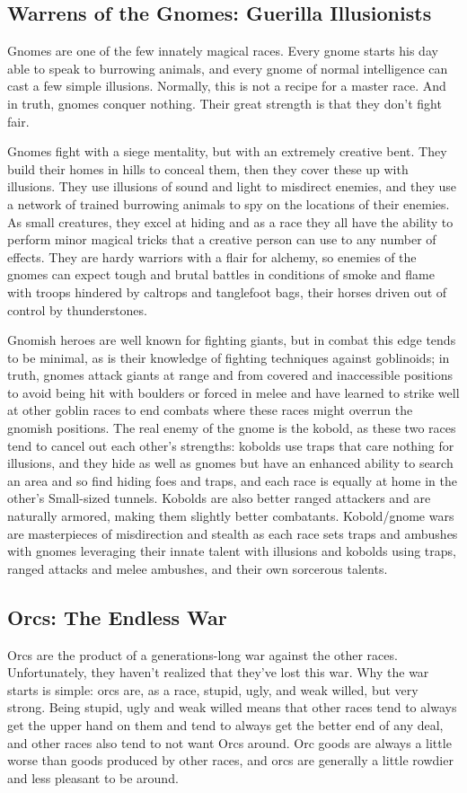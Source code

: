 \subsection{Warrens of the Gnomes: Guerilla Illusionists}
Gnomes are one of the few innately magical races. Every gnome starts his day able to speak to burrowing animals, and every gnome of normal intelligence can cast a few simple illusions. Normally, this is not a recipe for a master race. And in truth, gnomes conquer nothing. Their great strength is that they don't fight fair.

Gnomes fight with a siege mentality, but with an extremely creative bent. They build their homes in hills to conceal them, then they cover these up with illusions. They use illusions of sound and light to misdirect enemies, and they use a network of trained burrowing animals to spy on the locations of their enemies. As small creatures, they excel at hiding and as a race they all have the ability to perform minor magical tricks that a creative person can use to any number of effects. They are hardy warriors with a flair for alchemy, so enemies of the gnomes can expect tough and brutal battles in conditions of smoke and flame with troops hindered by caltrops and tanglefoot bags, their horses driven out of control by thunderstones.

Gnomish heroes are well known for fighting giants, but in combat this edge tends to be minimal, as is their knowledge of fighting techniques against goblinoids; in truth, gnomes attack giants at range and from covered and inaccessible positions to avoid being hit with boulders or forced in melee and have learned to strike well at other goblin races to end combats where these races might overrun the gnomish positions. The real enemy of the gnome is the kobold, as these two races tend to cancel out each other's strengths: kobolds use traps that care nothing for illusions, and they hide as well as gnomes but have an enhanced ability to search an area and so find hiding foes and traps, and each race is equally at home in the other's Small-sized tunnels. Kobolds are also better ranged attackers and are naturally armored, making them slightly better combatants. Kobold/gnome wars are masterpieces of misdirection and stealth as each race sets traps and ambushes with gnomes leveraging their innate talent with illusions and kobolds using traps, ranged attacks and melee ambushes, and their own sorcerous talents.

\subsection{Orcs: The Endless War}
Orcs are the product of a generations-long war against the other races. Unfortunately, they haven't realized that they've lost this war. Why the war starts is simple: orcs are, as a race, stupid, ugly, and weak willed, but very strong. Being stupid, ugly and weak willed means that other races tend to always get the upper hand on them and tend to always get the better end of any deal, and other races also tend to not want Orcs around. Orc goods are always a little worse than goods produced by other races, and orcs are generally a little rowdier and less pleasant to be around.

